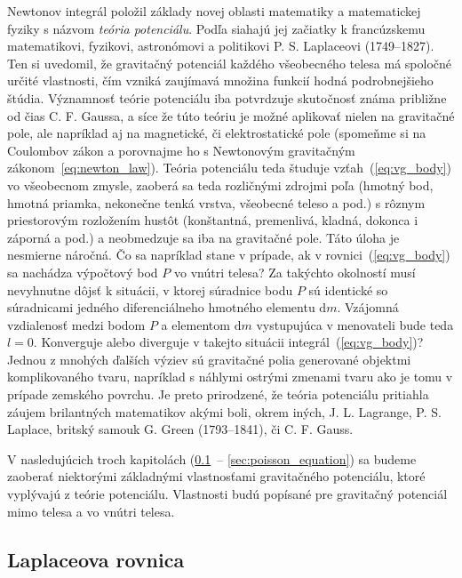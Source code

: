 \documentclass[a4paper, 12pt]{book}
\newcommand{\diff}{\mathrm d}
\begin{document}
Newtonov integrál položil základy novej oblasti matematiky a matematickej 
fyziky s názvom \emph{teória potenciálu}.  Podľa \cite{MacMillan1930} siahajú 
jej začiatky k francúzskemu matematikovi, fyzikovi, astronómovi a politikovi 
P. S. Laplaceovi (1749--1827).  Ten si uvedomil, že gravitačný potenciál 
každého všeobecného telesa má spoločné určité vlastnosti, čím vzniká zaujímavá 
množina funkcií hodná podrobnejšieho štúdia.  Významnosť teórie potenciálu iba 
potvrdzuje skutočnosť známa približne od čias C. F. Gaussa, a síce že túto 
teóriu je možné aplikovať nielen na gravitačné pole, ale  napríklad aj na 
magnetické, či elektrostatické pole (spomeňme si na Coulombov zákon 
a porovnajme ho s Newtonovým gravitačným zákonom~\ref{eq:newton_law}).  Teória 
potenciálu teda študuje vzťah~(\ref{eq:vg_body}) vo všeobecnom zmysle, zaoberá 
sa teda rozličnými zdrojmi poľa (hmotný bod, hmotná priamka, nekonečne tenká 
vrstva, všeobecné teleso a pod.) s rôznym priestorovým rozložením hustôt 
(konštantná, premenlivá, kladná, dokonca i záporná a pod.) a neobmedzuje sa iba 
na gravitačné pole.  Táto úloha je nesmierne náročná.  Čo sa napríklad stane 
v prípade, ak v rovnici~(\ref{eq:vg_body}) sa nachádza výpočtový bod $P$ vo 
vnútri telesa?  Za takýchto okolností musí nevyhnutne dôjsť k situácii, 
v ktorej súradnice bodu $P$ sú identické so súradnicami jedného diferenciálneho 
hmotného elementu $\diff m$.  Vzájomná vzdialenosť medzi bodom $P$ a elementom 
$\diff m$ vystupujúca v menovateli bude teda $l = 0$.  Konverguje alebo 
diverguje v takejto situácii integrál~(\ref{eq:vg_body})?  Jednou z mnohých 
ďalších výziev sú gravitačné polia generované objektmi komplikovaného tvaru, 
napríklad s náhlymi ostrými zmenami tvaru ako je tomu v prípade zemského 
povrchu.  Je preto prirodzené, že teória potenciálu pritiahla záujem 
brilantných matematikov akými boli, okrem iných, J. L. Lagrange, P. S. Laplace, 
britský samouk G. Green (1793--1841), či C. F. Gauss.

V nasledujúcich troch kapitolách (\ref{sec:laplace_equation}~-- 
\ref{sec:poisson_equation}) sa budeme zaoberať niektorými základnými 
vlastnosťami gravitačného potenciálu, ktoré vyplývajú z teórie potenciálu.  
Vlastnosti budú popísané pre gravitačný potenciál mimo telesa a vo vnútri 
telesa.





\subsection{Laplaceova rovnica}
\label{sec:laplace_equation}
\end{document}
